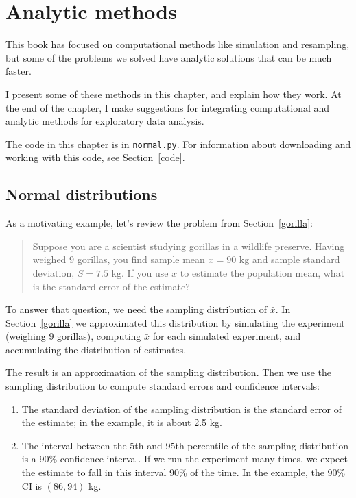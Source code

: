\documentclass[12pt]{book}
\newcommand{\xbar}{\bar{x}}
\theoremstyle{exercise}
\begin{document}
\chapter{Analytic methods}%
\label{analysis}

This book has focused on computational methods like simulation and
resampling, but some of the problems we solved have
analytic solutions that can be much faster.%
%
%

I present some of these methods in this chapter, and explain
how they work.  At the end of the chapter, I make suggestions
for integrating computational and analytic methods for exploratory
data analysis.

The code in this chapter is in {\tt normal.py}.  For information
about downloading and working with this code, see Section~\ref{code}.


\section{Normal distributions}%
\label{why_normal}%
%
%
%

As a motivating example, let's review the problem from
Section~\ref{gorilla}:%

\begin{quotation}
\noindent Suppose you are a scientist studying gorillas in a wildlife
preserve.  Having weighed 9 gorillas, you find sample mean $\xbar=90$ kg and
sample standard deviation, $S=7.5$ kg.  If you use $\xbar$ to estimate
the population mean, what is the standard error of the estimate?
\end{quotation}

To answer that question, we need the sampling
distribution of $\xbar$.  In Section~\ref{gorilla} we approximated
this distribution by simulating the experiment (weighing
9 gorillas), computing $\xbar$ for each simulated experiment, and
accumulating the distribution of estimates.%
%

The result is an approximation of the sampling distribution.  Then we
use the sampling distribution to compute standard errors and
confidence intervals:%
%

\begin{enumerate}

\item The standard deviation of the sampling distribution is the
  standard error of the estimate; in the example, it is about
  2.5 kg.

\item The interval between the 5th and 95th percentile of the sampling
  distribution is a 90\% confidence interval.  If we run the
  experiment many times, we expect the estimate to fall in this
  interval 90\% of the time.  In the example, the 90\% CI is
  $(86, 94)$ kg.

\end{enumerate}
\end{document}
